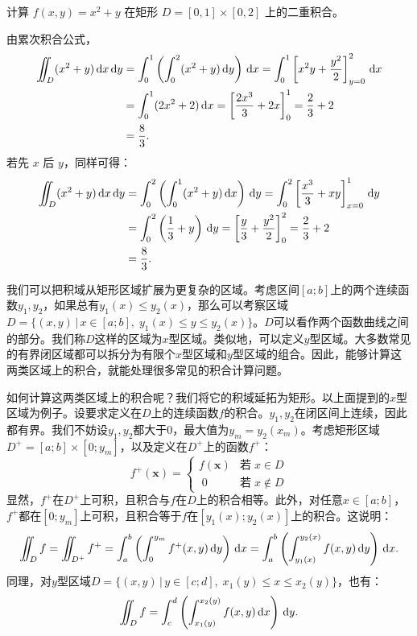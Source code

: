 \documentclass[12pt,UTF8]{ctexbook}
\begin{document}
\begin{et}
    计算 $f(x,y)=x^2+y$ 在矩形 $D=[0,1]\times[0,2]$ 上的二重积合。
\end{et}
\begin{so}
    由累次积合公式，
    \begin{align*}
         \int\!\!\!\!\!\int_D (x^2+y) \,\mathrm{d}x\,\mathrm{d}y &= \int_0^1 \left( \int_0^2 (x^2+y) \,\mathrm{d}y \right) \,\mathrm{d}x = \int_0^1 \left[ x^2 y + \frac{y^2}{2} \right]_{y=0}^{2} \,\mathrm{d}x \\
         &= \int_0^1 (2x^2+2) \,\mathrm{d}x = \left[ \frac{2x^3}{3}+2x \right]_0^1 = \frac{2}{3}+2 \\
         &= \frac{8}{3}.
    \end{align*}
    若先 $x$ 后 $y$，同样可得：
    \begin{align*}
        \int\!\!\!\!\!\int_D (x^2+y) \,\mathrm{d}x\,\mathrm{d}y &= \int_0^2 \left( \int_0^1 (x^2+y) \,\mathrm{d}x \right) \,\mathrm{d}y = \int_0^2 \left[ \frac{x^3}{3}+xy \right]_{x=0}^{1} \,\mathrm{d}y \\
        &= \int_0^2 \left( \frac{1}{3}+y \right) \,\mathrm{d}y = \left[ \frac{y}{3}+\frac{y^2}{2} \right]_0^2 = \frac{2}{3}+2 \\
        &= \frac{8}{3}.
    \end{align*}
\end{so}

我们可以把积域从矩形区域扩展为更复杂的区域。考虑区间$[a;b]$上的两个连续函数$y_1,y_2$，如果总有$y_1(x)\leqslant y_2(x)$，那么可以考察区域$D = \{(x,y)\,|\,x\in[a;b],\;y_1(x)\leqslant y\leqslant y_2(x)\}$。$D$可以看作两个函数曲线之间的部分。我们称$D$这样的区域为$x$\dash 型区域。类似地，可以定义$y$\dash 型区域。大多数常见的有界闭区域都可以拆分为有限个$x$\dash 型区域和$y$\dash 型区域的组合。因此，能够计算这两类区域上的积合，就能处理很多常见的积合计算问题。

如何计算这两类区域上的积合呢？我们将它的积域延拓为矩形。以上面提到的$x$\dash 型区域为例子。设要求定义在$D$上的连续函数$f$的积合。$y_1,y_2$在闭区间上连续，因此都有界。我们不妨设$y_1,y_2$都大于$0$，最大值为$y_m=y_2(x_m)$。考虑矩形区域$D^+=[a;b]\times[0;y_m]$，以及定义在$D^+$上的函数$f^+$：
$$
f^+(\mathbf{x}) = \begin{cases}
    f(\mathbf{x}) & \mbox{若}\;x\in D\\
    \;0 &  \mbox{若}\;x\notin D
\end{cases}
$$
显然，$f^+$在$D^+$上可积，且积合与$f$在$D$上的积合相等。此外，对任意$x\in[a;b]$，$f^+$都在$[0;y_m]$上可积，且积合等于$f$在$[y_1(x);y_2(x)]$上的积合。这说明：
$$ \jii_{D} f = \jii_{D^+} f^+ = \int_{a}^b \left(\int_{0}^{y_m} f^+(x,y)\di{y}\right)\di{x} = \int_{a}^b \left(\int_{y_1(x)}^{y_2(x)} f(x,y)\di{y}\right)\di{x}. $$
同理，对$y$\dash 型区域$D = \{(x,y)\,|\,y\in[c;d],\;x_1(y)\leqslant x\leqslant x_2(y)\}$，也有：
$$ \int\!\!\!\!\!\int_{D} f = \int_{c}^d \left(\int_{x_1(y)}^{x_2(y)} f(x,y)\,\mathrm{d}x\right)\,\mathrm{d}y. $$
\end{document}
